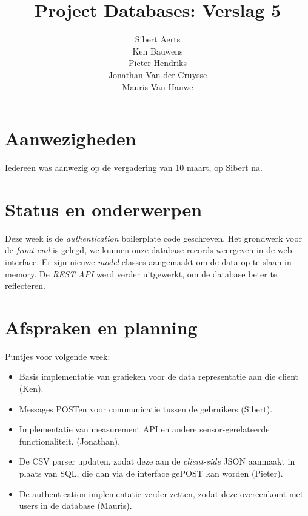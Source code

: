\documentclass[10pt,a4paper]{article}
\author{Sibert Aerts\\
Ken Bauwens\\
Pieter Hendriks\\
Jonathan Van der Cruysse\\
Mauris Van Hauwe}
\title{Project Databases: Verslag 5}
\date{}
\begin{document}
  \maketitle
  \section{Aanwezigheden}
  Iedereen was aanwezig op de vergadering van 10 maart, op Sibert na.
  
  \section{Status en onderwerpen}
  Deze week is de \emph{authentication} boilerplate code geschreven. 
  Het grondwerk voor de \emph{front-end} is gelegd, we kunnen onze database records weergeven in de web interface.
  Er zijn nieuwe \emph{model} classes aangemaakt om de data op te slaan in memory.
  De \emph{REST API} werd verder uitgewerkt, om de database beter te reflecteren.
  
  \section{Afspraken en planning}
  Puntjes voor volgende week:
  \begin{itemize}
    
    \item Basis implementatie van grafieken voor de data representatie aan die client (Ken).
    
    \item Messages POSTen voor communicatie tussen de gebruikers (Sibert).
    
    \item Implementatie van measurement API en andere sensor-gerelateerde functionaliteit. (Jonathan).
    
    \item De CSV parser updaten, zodat deze aan de \emph{client-side} JSON aanmaakt in plaats van SQL, die dan via de interface gePOST kan worden (Pieter).
    
    \item De authentication implementatie verder zetten, zodat deze overeenkomt met users in de database (Mauris).
  \end{itemize}
\end{document}
